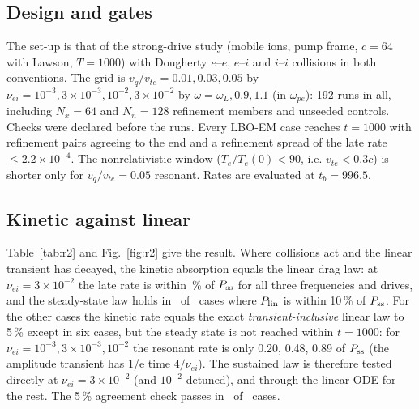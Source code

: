 \documentclass[aps,pre,reprint,floatfix,amsmath,amssymb,nofootinbib,superscriptaddress]{revtex4-2}
\newcommand{\vq}{v_q/v_{te}}
\newcommand{\wpe}{\omega_{pe}}
\begin{document}
\subsection{Design and gates}
The set-up is that of the strong-drive study (mobile ions, pump frame, $c=64$ with Lawson, $T=1000$) with Dougherty $e$--$e$, $e$--$i$ and $i$--$i$ collisions in both conventions. The grid is $\vq=0.01,0.03,0.05$ by $\nu_{ei}=10^{-3},3\times10^{-3},10^{-2},3\times10^{-2}$ by $\omega=\omega_L,0.9,1.1$ (in $\wpe$): 192 runs in all, including $N_x=64$ and $N_n=128$ refinement members and unseeded controls. Checks were declared before the runs. Every LBO-EM case reaches $t=1000$ with refinement pairs agreeing to the end and a refinement spread of the late rate $\le2.2\times10^{-4}$. The nonrelativistic window ($T_e/T_e(0)<90$, i.e. $v_{te}<0.3c$) is shorter only for $\vq=0.05$ resonant. Rates are evaluated at $t_b=996.5$.

\subsection{Kinetic against linear}
\begin{table}[t]
\caption{Late-time absorbed power, kinetic ($N_x=32$, $N_n=64$, LBO-EM) against the exact transient-inclusive linear law, $\vq=0.03$. $T_e/T_e(0)$ at $t_b$; last column: kinetic equals linear within 5\,\%.}\label{tab:r2}
\small
\tabRtwo
\end{table}
Table~\ref{tab:r2} and Fig.~\ref{fig:r2} give the result. Where collisions act and the linear transient has decayed, the kinetic absorption equals the linear drag law: at $\nu_{ei}=3\times10^{-2}$ the late rate is within \rtwoPss\,\% of $P_{\rm ss}$ for all three frequencies and drives, and the steady-state law holds in \rtwoKthree\ of \rtwoKthreeN\ cases where $P_{\rm lin}$ is within 10\,\% of $P_{\rm ss}$. For the other cases the kinetic rate equals the exact \emph{transient-inclusive} linear law to 5\,\% except in six cases, but the steady state is not reached within $t=1000$: for $\nu_{ei}=10^{-3},3\times10^{-3},10^{-2}$ the resonant rate is only 0.20, 0.48, 0.89 of $P_{\rm ss}$ (the amplitude transient has 1/e time $4/\nu_{ei}$). The sustained law is therefore tested directly at $\nu_{ei}=3\times10^{-2}$ (and $10^{-2}$ detuned), and through the linear ODE for the rest. The 5\,\% agreement check passes in \rtwoKtwo\ of \rtwoKtwoN\ cases.
\end{document}
